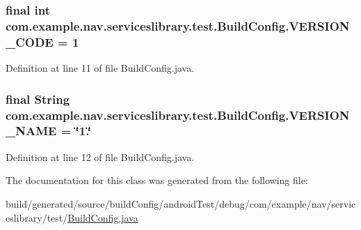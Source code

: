 \subsubsection[{\texorpdfstring{V\+E\+R\+S\+I\+O\+N\+\_\+\+C\+O\+DE}{VERSION_CODE}}]{\setlength{\rightskip}{0pt plus 5cm}final int com.\+example.\+nav.\+serviceslibrary.\+test.\+Build\+Config.\+V\+E\+R\+S\+I\+O\+N\+\_\+\+C\+O\+DE = 1\hspace{0.3cm}{\ttfamily [static]}}\hypertarget{classcom_1_1example_1_1nav_1_1serviceslibrary_1_1test_1_1_build_config_a8cb9753aa84da12d7005337e7e402033}{}\label{classcom_1_1example_1_1nav_1_1serviceslibrary_1_1test_1_1_build_config_a8cb9753aa84da12d7005337e7e402033}


Definition at line 11 of file Build\+Config.\+java.

\subsubsection[{\texorpdfstring{V\+E\+R\+S\+I\+O\+N\+\_\+\+N\+A\+ME}{VERSION_NAME}}]{\setlength{\rightskip}{0pt plus 5cm}final String com.\+example.\+nav.\+serviceslibrary.\+test.\+Build\+Config.\+V\+E\+R\+S\+I\+O\+N\+\_\+\+N\+A\+ME = \char`\"{}1.\char`\"{}\hspace{0.3cm}{\ttfamily [static]}}\hypertarget{classcom_1_1example_1_1nav_1_1serviceslibrary_1_1test_1_1_build_config_aa97bf920241755f014bef41b4d67443f}{}\label{classcom_1_1example_1_1nav_1_1serviceslibrary_1_1test_1_1_build_config_aa97bf920241755f014bef41b4d67443f}


Definition at line 12 of file Build\+Config.\+java.



The documentation for this class was generated from the following file\+:\begin{DoxyCompactItemize}
\item 
build/generated/source/build\+Config/android\+Test/debug/com/example/nav/serviceslibrary/test/\hyperlink{android_test_2debug_2com_2example_2nav_2serviceslibrary_2test_2_build_config_8java}{Build\+Config.\+java}\end{DoxyCompactItemize}
